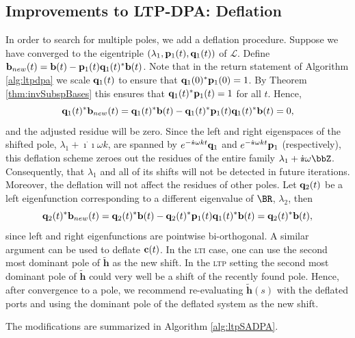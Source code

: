 \documentclass[pdflatex,sn-mathphys-num]{sn-jnl}%
\theoremstyle{thmstyleone}%
\theoremstyle{thmstyletwo}%
\theoremstyle{thmstylethree}%
\def\Bb{{\bf b}}  \def\BB{{\bf B}}
\def\Bc{{\bf c}}  \def\BC{{\bf C}}
\def\Bp{{\bf p}}  \def\BP{{\bf P}}
\def\Bq{{\bf q}}  \def\BQ{{\bf Q}}
\def\ii{\dot{\imath\!\imath}}
\def\Lop{\mathscr{L}}
\def\htil{\widetilde{\mathbf{h}}}
\begin{document}
\subsection{Improvements to {\small LTP}-{\small DPA}: Deflation}
In order to search for multiple poles, we add a deflation procedure. Suppose we have converged to the eigentriple $(\lambda_1,\Bp_1(t),\Bq_1(t))$ of $\Lop$. Define $\Bb_{new}(t)=\Bb(t)-\Bp_1(t)\Bq_1(t)^*\Bb(t)$. Note that in the return statement of Algorithm \ref{alg:ltpdpa} we scale $\Bq_1(t)$ to ensure that $\Bq_1(0)^*\Bp_1(0) = 1$. By Theorem \ref{thm:invSubspBases} this ensures that $\Bq_1(t)^*\Bp_1(t) = 1$ for all $t$. Hence, 
\begin{equation}
\Bq_1(t)^*\Bb_{new}(t)=\Bq_1(t)^*\Bb(t)-\Bq_1(t)^*\Bp_1(t)\Bq_1(t)^*\Bb(t)=0,\end{equation}
and the adjusted residue will be zero. Since the left and right eigenspaces of the shifted pole, $\lambda_1+\ii\omega k$, are spanned by $e^{-\ii\omega k t}\Bq_1$ and $e^{-\ii\omega k t}\Bp_1$ (respectively), this deflation scheme zeroes out the residues of the entire family $\lambda_1+\ii\omega\bbZ$. Consequently, that $\lambda_1$ and all of its shifts will not be detected in future iterations.\\

Moreover, the deflation will not affect the residues of other poles. Let $\Bq_2(t)$ be a left eigenfunction corresponding to a different eigenvalue of $\BR$, $\lambda_2$, then 
\begin{equation}
\Bq_2(t)^*\Bb_{new}(t) = \Bq_2(t)^*\Bb(t)-\Bq_2(t)^*\Bp_1(t)\Bq_1(t)^*\Bb(t)=\Bq_2(t)^*\Bb(t),
\end{equation}
since left and right eigenfunctions are pointwise bi-orthogonal. A similar argument can be used to deflate $\Bc(t)$.
In the \textsc{lti} case, one can use the second most dominant pole of $\htil$ as the new shift. In the \textsc{ltp} setting the second most dominant pole of $\htil$ could very well be a shift of the recently found pole. Hence, after convergence to a pole, we recommend re-evaluating $\htil(s)$ with the deflated ports and using the dominant pole of the deflated system as the new shift.  

The modifications are summarized in Algorithm \ref{alg:ltpSADPA}.
\end{document}
